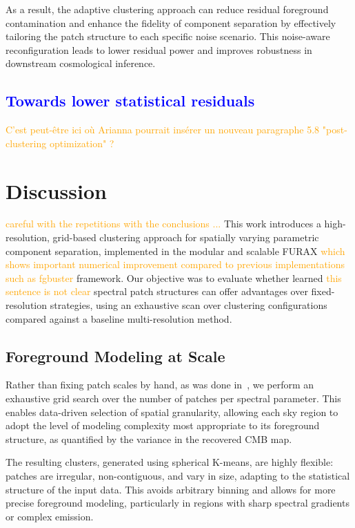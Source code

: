 \documentclass[fleqn,usenatbib]{mnras}
\newcommand{\ar}[1]{\textcolor{blue}{#1}}
\newcommand{\je}[1]{\textcolor{orange}{#1}}
\begin{document}
As a result, the adaptive clustering approach can reduce residual foreground contamination and enhance the fidelity of component separation by effectively tailoring the patch structure to each specific noise scenario. This noise-aware reconfiguration leads to lower residual power and improves robustness in downstream cosmological inference.

\ar{\section{Towards lower statistical residuals}}


\je{C'est peut-être ici où Arianna pourrait insérer un nouveau paragraphe 5.8 
"post-clustering optimization" ?}

\section{Discussion}
\label{sec:discussion}

\je{careful with the repetitions with the conclusions ...} This work introduces a high-resolution, grid-based clustering approach for spatially varying parametric component separation, implemented in the modular and scalable \textsc{FURAX} \je{which shows important numerical improvement compared to previous implementations such as fgbuster} framework. Our objective was to evaluate whether learned \je{this sentence is not clear} spectral patch structures can offer advantages over fixed-resolution strategies, using an exhaustive scan over clustering configurations compared against a baseline multi-resolution method.

\subsection*{Foreground Modeling at Scale}

Rather than fixing patch scales by hand, as was done in~\citep{LiteBIRD_PTEP_2022}, we perform an exhaustive grid search over the number of patches per spectral parameter. This enables data-driven selection of spatial granularity, allowing each sky region to adopt the level of modeling complexity most appropriate to its foreground structure, as quantified by the variance in the recovered CMB map.

The resulting clusters, generated using spherical K-means, are highly flexible: patches are irregular, non-contiguous, and vary in size, adapting to the statistical structure of the input data. This avoids arbitrary binning and allows for more precise foreground modeling, particularly in regions with sharp spectral gradients or complex emission.
\end{document}
